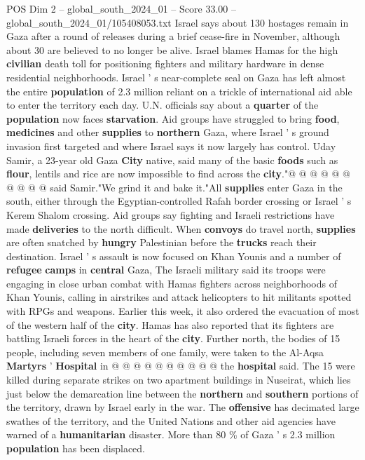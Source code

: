 \begin{textsample}{POS Dim 2 – global\_south\_2024\_01 – Score 33.00 – global\_south\_2024\_01/105408053.txt}
Israel says about 130 hostages remain in Gaza after a round of releases during a brief cease-fire in November, although about 30 are believed to no longer be alive.
Israel blames Hamas for the high \textbf{civilian} death toll for positioning fighters and military hardware in dense residential neighborhoods.
Israel ' s near-complete seal on Gaza has left almost the entire \textbf{population} of 2.3 million reliant on a trickle of international aid able to enter the territory each day.
U.N. officials say about a \textbf{quarter} of the \textbf{population} now faces \textbf{starvation}.
Aid groups have struggled to bring \textbf{food}, \textbf{medicines} and other \textbf{supplies} to \textbf{northern} Gaza, where Israel ' s ground invasion first targeted and where Israel says it now largely has control.
Uday Samir, a 23-year old Gaza \textbf{City} native, said many of the basic \textbf{foods} such as \textbf{flour}, lentils and rice are now impossible to find across the \textbf{city}."@ @ @ @ @ @ @ @ @ @ said Samir."We grind it and bake it."All \textbf{supplies} enter Gaza in the south, either through the Egyptian-controlled Rafah border crossing or Israel ' s Kerem Shalom crossing.
Aid groups say fighting and Israeli restrictions have made \textbf{deliveries} to the north difficult.
When \textbf{convoys} do travel north, \textbf{supplies} are often snatched by \textbf{hungry} Palestinian before the \textbf{trucks} reach their destination.
Israel ' s assault is now focused on Khan Younis and a number of \textbf{refugee} \textbf{camps} in \textbf{central} Gaza, The Israeli military said its troops were engaging in close urban combat with Hamas fighters across neighborhoods of Khan Younis, calling in airstrikes and attack helicopters to hit militants spotted with RPGs and weapons.
Earlier this week, it also ordered the evacuation of most of the western half of the \textbf{city}.
Hamas has also reported that its fighters are battling Israeli forces in the heart of the \textbf{city}.
Further north, the bodies of 15 people, including seven members of one family, were taken to the Al-Aqsa \textbf{Martyrs} ' \textbf{Hospital} in @ @ @ @ @ @ @ @ @ @ the \textbf{hospital} said.
The 15 were killed during separate strikes on two apartment buildings in Nuseirat, which lies just below the demarcation line between the \textbf{northern} and \textbf{southern} portions of the territory, drawn by Israel early in the war.
The \textbf{offensive} has decimated large swathes of the territory, and the United Nations and other aid agencies have warned of a \textbf{humanitarian} disaster.
More than 80 \% of Gaza ' s 2.3 million \textbf{population} has been displaced.

\end{textsample}
